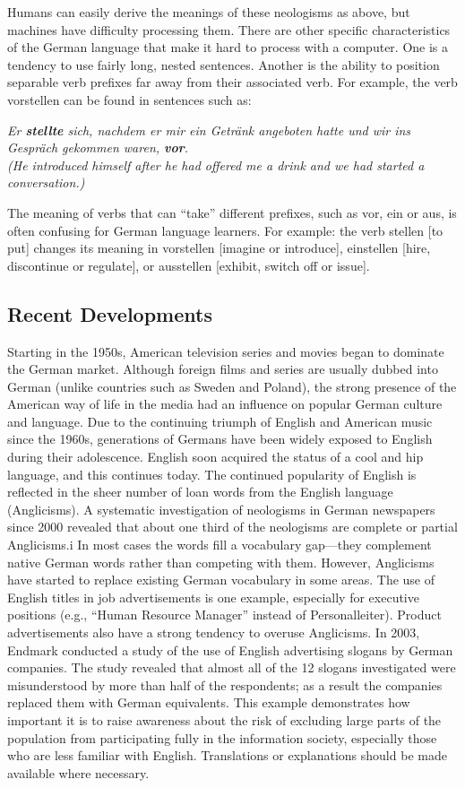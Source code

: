 \documentclass[]{../metanetpaper}
\begin{document}
Humans can easily derive the meanings of these neologisms as above, but machines have difficulty processing them. 
There are other specific characteristics of the German language that make it hard to process with a computer. One is a tendency to use fairly long, nested sentences. Another is the ability to position separable verb prefixes far away from their associated verb. For example, the verb vorstellen can be found in sentences such as:
\begin{center}
\textit{Er \textbf{stellte} sich, nachdem er mir ein Getränk angeboten hatte und wir ins Gespräch gekommen waren, \textbf{vor}.\\
(He introduced himself after he had offered me a drink and we had started a conversation.)}
\end{center}
The meaning of verbs that can “take” different prefixes, such as vor, ein or aus, is often confusing for German language learners. For example: the verb stellen [to put] changes its meaning in vorstellen [imagine or introduce], einstellen [hire, discontinue or regulate], or ausstellen [exhibit, switch off or issue].

	\subsection{Recent Developments}
Starting in the 1950s, American television series and movies began to dominate the German market. Although foreign films and series are usually dubbed into German (unlike countries such as Sweden and Poland), the strong presence of the American way of life in the media had an influence on popular German culture and language. Due to the continuing triumph of English and American music since the 1960s, generations of Germans have been widely exposed to English during their adolescence. English soon acquired the status of a cool and hip language, and this continues today.
The continued popularity of English is reflected in the sheer number of loan words from the English language (Anglicisms). A systematic investigation of neologisms in German newspapers since 2000 revealed that about one third of the neologisms are complete or partial Anglicisms.i In most cases the words fill a vocabulary gap—they complement native German words rather than competing with them. However, Anglicisms have started to replace existing German vocabulary in some areas. The use of English titles in job advertisements is one example, especially for executive positions (e.g., “Human Resource Manager” instead of Personalleiter). Product advertisements also have a strong tendency to overuse Anglicisms. In 2003, Endmark conducted a study of the use of English advertising slogans by German companies. The study revealed that almost all of the 12 slogans investigated were misunderstood by more than half of the respondents; as a result the companies replaced them with German equivalents. This example demonstrates how important it is to raise awareness about the risk of excluding large parts of the population from participating fully in the information society, especially those who are less familiar with English. Translations or explanations should be made available where necessary.
\end{document}
